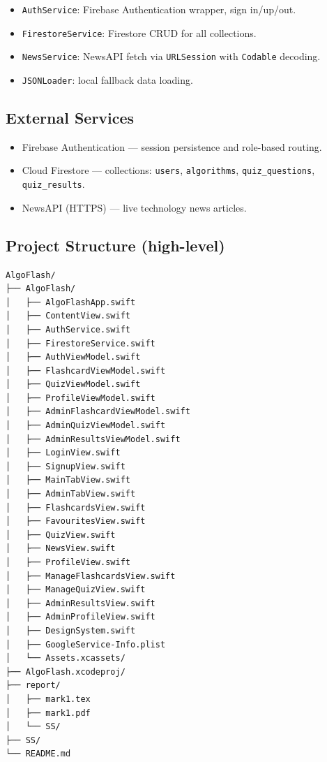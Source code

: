 \documentclass[12pt,a4paper]{article}
\begin{document}
\begin{itemize}[leftmargin=1.5em, itemsep=3pt]
  \item \texttt{AuthService}: Firebase Authentication wrapper, sign in/up/out.
  \item \texttt{FirestoreService}: Firestore CRUD for all collections.
  \item \texttt{NewsService}: NewsAPI fetch via \texttt{URLSession} with \texttt{Codable} decoding.
  \item \texttt{JSONLoader}: local fallback data loading.
\end{itemize}

\subsection*{External Services}

\begin{itemize}[leftmargin=1.5em, itemsep=3pt]
  \item Firebase Authentication --- session persistence and role-based routing.
  \item Cloud Firestore --- collections: \texttt{users}, \texttt{algorithms},
        \texttt{quiz\_questions}, \texttt{quiz\_results}.
  \item NewsAPI (HTTPS) --- live technology news articles.
\end{itemize}

\subsection*{Project Structure (high-level)}

\begin{verbatim}
AlgoFlash/
├── AlgoFlash/
│   ├── AlgoFlashApp.swift
│   ├── ContentView.swift
│   ├── AuthService.swift
│   ├── FirestoreService.swift
│   ├── AuthViewModel.swift
│   ├── FlashcardViewModel.swift
│   ├── QuizViewModel.swift
│   ├── ProfileViewModel.swift
│   ├── AdminFlashcardViewModel.swift
│   ├── AdminQuizViewModel.swift
│   ├── AdminResultsViewModel.swift
│   ├── LoginView.swift
│   ├── SignupView.swift
│   ├── MainTabView.swift
│   ├── AdminTabView.swift
│   ├── FlashcardsView.swift
│   ├── FavouritesView.swift
│   ├── QuizView.swift
│   ├── NewsView.swift
│   ├── ProfileView.swift
│   ├── ManageFlashcardsView.swift
│   ├── ManageQuizView.swift
│   ├── AdminResultsView.swift
│   ├── AdminProfileView.swift
│   ├── DesignSystem.swift
│   ├── GoogleService-Info.plist
│   └── Assets.xcassets/
├── AlgoFlash.xcodeproj/
├── report/
│   ├── mark1.tex
│   ├── mark1.pdf
│   └── SS/
├── SS/
└── README.md
\end{verbatim}
\end{document}
